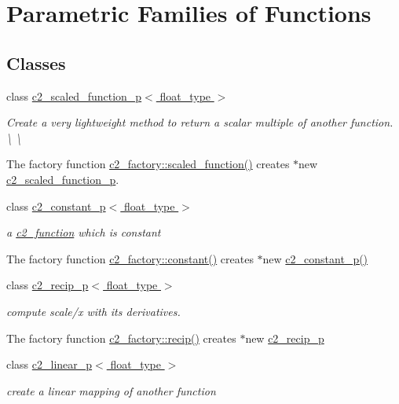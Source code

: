 \hypertarget{group__parametric__functions}{\section{Parametric Families of Functions}
\label{group__parametric__functions}
}
\subsection*{Classes}
\begin{DoxyCompactItemize}
\item 
class \hyperlink{classc2__scaled__function__p}{c2\-\_\-scaled\-\_\-function\-\_\-p$<$ float\-\_\-type $>$}
\begin{DoxyCompactList}\small\item\em Create a very lightweight method to return a scalar multiple of another function. \textbackslash{} \textbackslash{}

The factory function \hyperlink{classc2__factory_a81a7b686b7ffa389ad4dcd8d18997332}{c2\-\_\-factory\-::scaled\-\_\-function()} creates $\ast$new \hyperlink{classc2__scaled__function__p}{c2\-\_\-scaled\-\_\-function\-\_\-p}. \end{DoxyCompactList}\item 
class \hyperlink{classc2__constant__p}{c2\-\_\-constant\-\_\-p$<$ float\-\_\-type $>$}
\begin{DoxyCompactList}\small\item\em a \hyperlink{classc2__function}{c2\-\_\-function} which is constant

The factory function \hyperlink{classc2__factory_a98e385b2b927d15d4376821302061d4d}{c2\-\_\-factory\-::constant()} creates $\ast$new \hyperlink{classc2__constant__p}{c2\-\_\-constant\-\_\-p()} \end{DoxyCompactList}\item 
class \hyperlink{classc2__recip__p}{c2\-\_\-recip\-\_\-p$<$ float\-\_\-type $>$}
\begin{DoxyCompactList}\small\item\em compute scale/x with its derivatives.

The factory function \hyperlink{classc2__factory_adda01279d6b1059843e2aecc5be5d95e}{c2\-\_\-factory\-::recip()} creates $\ast$new \hyperlink{classc2__recip__p}{c2\-\_\-recip\-\_\-p} \end{DoxyCompactList}\item 
class \hyperlink{classc2__linear__p}{c2\-\_\-linear\-\_\-p$<$ float\-\_\-type $>$}
\begin{DoxyCompactList}\small\item\em create a linear mapping of another function


\end{DoxyCompactList}
\end{DoxyCompactItemize}
